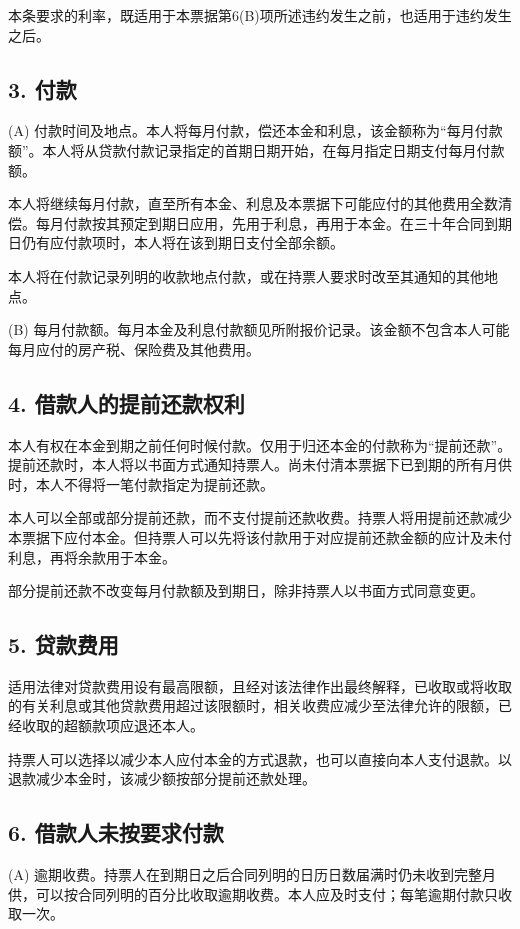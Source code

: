 \documentclass[UTF8,fontset=none,11pt,a4paper]{ctexart}
\begin{document}
本条要求的利率，既适用于本票据第6(B)项所述违约发生之前，也适用于违约发生之后。


\subsection*{3. 付款}
(A) 付款时间及地点。本人将每月付款，偿还本金和利息，该金额称为“每月付款额”。本人将从贷款付款记录指定的首期日期开始，在每月指定日期支付每月付款额。


本人将继续每月付款，直至所有本金、利息及本票据下可能应付的其他费用全数清偿。每月付款按其预定到期日应用，先用于利息，再用于本金。在三十年合同到期日仍有应付款项时，本人将在该到期日支付全部余额。


本人将在付款记录列明的收款地点付款，或在持票人要求时改至其通知的其他地点。


(B) 每月付款额。每月本金及利息付款额见所附报价记录。该金额不包含本人可能每月应付的房产税、保险费及其他费用。


\subsection*{4. 借款人的提前还款权利}
本人有权在本金到期之前任何时候付款。仅用于归还本金的付款称为“提前还款”。提前还款时，本人将以书面方式通知持票人。尚未付清本票据下已到期的所有月供时，本人不得将一笔付款指定为提前还款。


本人可以全部或部分提前还款，而不支付提前还款收费。持票人将用提前还款减少本票据下应付本金。但持票人可以先将该付款用于对应提前还款金额的应计及未付利息，再将余款用于本金。


部分提前还款不改变每月付款额及到期日，除非持票人以书面方式同意变更。


\subsection*{5. 贷款费用}
适用法律对贷款费用设有最高限额，且经对该法律作出最终解释，已收取或将收取的有关利息或其他贷款费用超过该限额时，相关收费应减少至法律允许的限额，已经收取的超额款项应退还本人。


持票人可以选择以减少本人应付本金的方式退款，也可以直接向本人支付退款。以退款减少本金时，该减少额按部分提前还款处理。


\subsection*{6. 借款人未按要求付款}
(A) 逾期收费。持票人在到期日之后合同列明的日历日数届满时仍未收到完整月供，可以按合同列明的百分比收取逾期收费。本人应及时支付；每笔逾期付款只收取一次。
\end{document}
